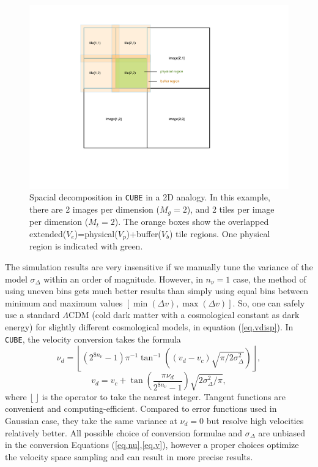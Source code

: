 \documentclass[10pt,twocolumn,preprint]{emulateapj}
\begin{document}
\begin{figure}
\centering
  \includegraphics[width=0.9\linewidth]{f2}
 \caption{Spacial decomposition in {\tt CUBE} in a 2D analogy. In this example, there are 2 images per dimension ($M_g=2$), and 2 tiles per image per dimension ($M_t=2$). The orange boxes show the overlapped extended($V_e$)=physical($V_p$)+buffer($V_b$) tile regions. One physical region is indicated with green.}
\label{fig.tile}
\end{figure}

The simulation results are very insensitive if we manually tune the variance of the model $\sigma_\Delta$ within an order of magnitude. However, in $n_\nu=1$ case, the method of using uneven bins gets much better results than simply using equal bins between minimum and maximum values $[\min(\Delta v),\max(\Delta v)]$. So, one can safely use a standard $\Lambda$CDM (cold dark matter with a cosmological constant as dark energy) for slightly different cosmological models, in equation (\ref{eq.vdisp}). In {\tt CUBE}, the velocity conversion takes the formula
\begin{equation}\label{eq.nu}
	\nu_d=\left\lfloor(2^{8n_\nu}-1)\pi^{-1}\tan^{-1}\left((v_d-v_c)\sqrt{\pi/2\sigma_\Delta^2}\right)\right\rfloor,
\end{equation}
\begin{equation}\label{eq.v}
	v_d=v_c+\tan\left(\frac{\pi\nu_d}{2^{8n_\nu}-1}\right)\sqrt{2\sigma_\Delta^2/\pi},
\end{equation}
where $\lfloor\ \rfloor$ is the operator to take the nearest integer. Tangent functions are convenient and computing-efficient. Compared to error functions used in Gaussian case, they take the same variance at $\nu_d=0$ but resolve high velocities relatively better.  All possible choice of conversion formulae and $\sigma_\Delta$ are unbiased in the conversion Equations (\ref{eq.nu},\ref{eq.v}), however a proper choices optimize the velocity space sampling and can result in more precise results.
\end{document}

